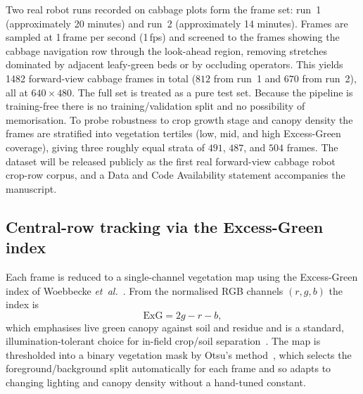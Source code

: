 \noindent Two real robot runs recorded on cabbage plots form the frame set: run~1 (approximately 20 minutes)
and run~2 (approximately 14 minutes). Frames are sampled at 1\,frame per second (1\,fps) and screened to the frames showing the cabbage navigation row through the look-ahead region, removing stretches dominated by adjacent leafy-green beds or by occluding operators. This yields 1482 forward-view cabbage frames
in total ($812$ from run~1 and $670$ from run~2), all at $640\times480$. The full set is treated as a pure
test set. Because the pipeline is training-free there is no training/validation split and no possibility of
memorisation. To probe robustness to crop growth stage and canopy density the frames are stratified into
vegetation tertiles (low, mid, and high Excess-Green coverage), giving three roughly equal strata of $491$,
$487$, and $504$ frames. The dataset will be released publicly as the first real forward-view cabbage robot
crop-row corpus, and a Data and Code Availability statement accompanies the manuscript.

\subsection{Central-row tracking via the Excess-Green index}
\label{sec:method:exg}

\noindent Each frame is reduced to a single-channel vegetation map using the Excess-Green index of Woebbecke
\textit{et~al.}~\cite{woebbecke1995}. From the normalised RGB channels $(r,g,b)$ the index is
\begin{equation}
\label{eq:exg}
\mathrm{ExG} = 2g - r - b ,
\end{equation}
which emphasises live green canopy against soil and residue and is a standard, illumination-tolerant
choice for in-field crop/soil separation~\cite{meyer2008}. The map is thresholded into a binary
vegetation mask by Otsu's method~\cite{otsu1979}, which selects the foreground/background split
automatically for each frame and so adapts to changing lighting and canopy density without a hand-tuned
constant.

